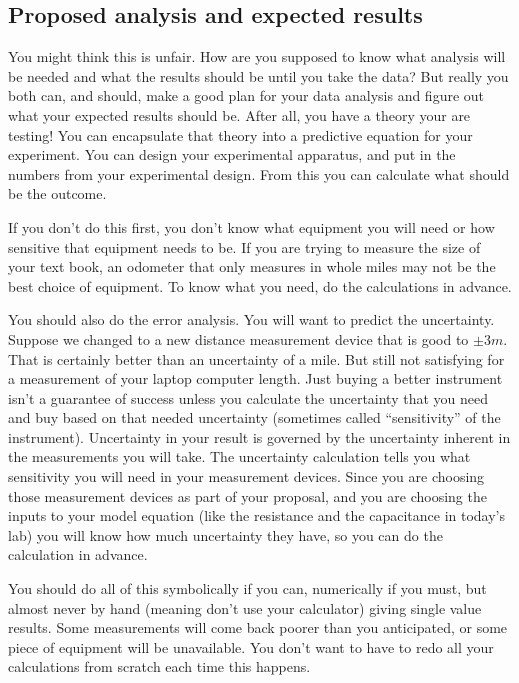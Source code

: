 \subsection{Proposed analysis and expected results}

You might think this is unfair. How are you supposed to know what analysis will be needed and what the results should be until you take the data? But really you both can, and should, make a good plan for your data analysis and figure out what your expected results should be. After all, you have a theory your are testing! You can encapsulate that theory into a predictive equation for your experiment. You can design your experimental apparatus, and put in the numbers from your experimental design. From this you can calculate what should be the outcome.

If you don't do this first, you don't know what equipment you will need or how sensitive that equipment needs to be. If you are trying to measure the size of your text book, an odometer that only measures in whole miles may not be the best choice of equipment. To know what you need, do the calculations in advance.

You should also do the error analysis. You will want to predict the uncertainty. Suppose we changed to a new distance measurement device that is good to $\pm 3\unit{m}$. That is certainly better than an uncertainty of a mile. But still not satisfying for a measurement of your laptop computer length. Just buying a better instrument isn't a guarantee of success unless you calculate the uncertainty that you need and buy based on that needed uncertainty (sometimes called ``sensitivity'' of the instrument).  Uncertainty in your result is governed by the uncertainty inherent in the measurements you will take. The uncertainty calculation tells you what sensitivity you will need in your measurement devices. Since you are choosing those measurement devices as part of your proposal, and you are choosing the inputs to your model equation (like the resistance and the capacitance in today's lab) you will know how much uncertainty they have, so you can do the calculation in advance.

You should do all of this symbolically if you can, numerically if you must, but almost never by hand (meaning don't use your calculator) giving single value results. Some measurements will come back poorer than you anticipated, or some piece of equipment will be unavailable. You don't want to have to redo all your calculations from scratch each time this happens. 

